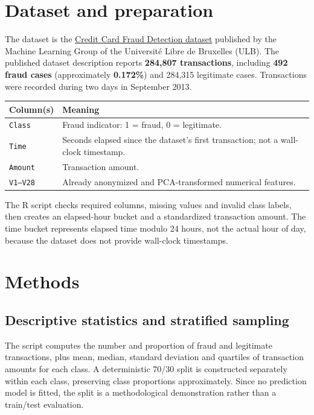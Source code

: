 \documentclass[11pt,a4paper]{article}
\begin{document}
\section{Dataset and preparation}

The dataset is the \href{https://www.kaggle.com/datasets/mlg-ulb/creditcardfraud}{Credit Card Fraud Detection dataset} published by the Machine Learning Group of the Universit\'e Libre de Bruxelles (ULB). The published dataset description reports \textbf{284,807 transactions}, including \textbf{492 fraud cases} (approximately \textbf{0.172\%}) and 284,315 legitimate cases. Transactions were recorded during two days in September 2013.

\begin{center}
\begin{tabular}{p{28mm} p{102mm}}
\toprule
\textbf{Column(s)} & \textbf{Meaning} \\
\midrule
\texttt{Class} & Fraud indicator: 1 = fraud, 0 = legitimate. \\
\texttt{Time} & Seconds elapsed since the dataset's first transaction; not a wall-clock timestamp. \\
\texttt{Amount} & Transaction amount. \\
\texttt{V1--V28} & Already anonymized and PCA-transformed numerical features. \\
\bottomrule
\end{tabular}
\end{center}

The R script checks required columns, missing values and invalid class labels, then creates an elapsed-hour bucket and a standardized transaction amount. The time bucket represents elapsed time modulo 24 hours, not the actual hour of day, because the dataset does not provide wall-clock timestamps.

\section{Methods}

\subsection{Descriptive statistics and stratified sampling}

The script computes the number and proportion of fraud and legitimate transactions, plus mean, median, standard deviation and quartiles of transaction amounts for each class. A deterministic 70/30 split is constructed separately within each class, preserving class proportions approximately. Since no prediction model is fitted, the split is a methodological demonstration rather than a train/test evaluation.
\end{document}
